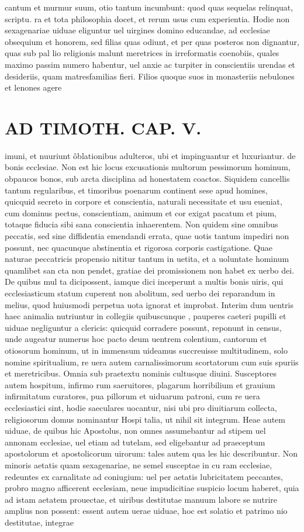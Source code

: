 \documentclass{article}
\begin{document}
\begin{pages}
cantum et murmur suum, otio tantum incumbunt: quod quas sequelas relinquat, scriptu. ra et tota philosophia docet, et rerum usus cum experientia. Hodie non sexagenariae uiduae eliguntur uel uirgines domino educandae, ad ecclesiae obsequium et honorem, sed filias quas odiunt, et per quas posteros non dignantur, quas sub pal lio religionis malunt meretrices in irreformatis coenobiis, quales maximo passim numero habentur, uel anxie ac turpiter in conscientiis urendas et desideriis, quam matresfamilias fieri. Filios quoque suos in monasteriis nebulones et lenones agere  \pend
\section*{AD TIMOTH. CAP. V. }
\marginpar{[ p.517 ]}\pstart imuni, et nuuriunt ôblationibus adulteros, ubi et impinguantur et luxuriantur. de bonis ecclesiae. Non est hic locus excusationis multorum pessimorum hominum, obpaucos bonos, sub arcta disciplina ad honestatem coactos. Siquidem cancellis tantum regularibus, et timoribus poenarum continent sese apud homines, quicquid secreto in corpore et conscientia, naturali necessitate et usu eueniat, cum dominus pectus, conscientiam, animum et cor exigat pacatum et pium, totaque fiducia sibi sana conscientia inhaerentem. Non quidem sine omnibus peccatis, sed sine diffidentia emendandi errata, quae uotis tantum impediri non possunt, nec quacunque abstinentia et rigorosa corporis castigatione. Quae naturae peccatricis propensio nititur tantum in uetita, et a uoluntate hominum quamlibet san cta non pendet, gratiae dei promissionem non habet ex uerbo dei. De quibus mul ta dicipossent, iamque dici inceperunt a multis bonis uiris, qui ecclesiasticum statum cuperent non abolitum, sed uerbo dei reparandum in melius, quod huiusmodi perpetua uota ignorat et improbat. Interim dum uentris haec animalia nutriuntur in collegiis quibuscunque , pauperes caeteri pupilli et uiduae negliguntur a clericis: quicquid corradere possunt, reponunt in census, unde augeatur numerus hoc pacto deum uentrem colentium, cantorum et otiosorum hominum, ut in immensum uideamus succreuisse multitudinem, solo nomine spiritualium, re uera autem carnalissimorum scortatorum cum suis spuriis et meretricibus. Omnia sub praetextu nominis cultusque diuini. Susceptores autem hospitum, infirmo rum saeruitores, plagarum horribilium et grauium infirmitatum curatores, pua pillorum et uiduarum patroni, cum re uera ecclesiastici sint, hodie saeculares uocantur, nisi ubi pro diuitiarum collecta, religiosorum domus nominantur Hospi talia, ut nihil sit integrum. Heae autem uiduae, de quibus hic Apostolus, non omnes assumebantur ad stipem uel annonam ecclesiae, uel etiam ad tutelam, sed eligebantur ad praeceptum apostolorum et apostolicorum uirorum: tales autem qua les hic describuntur. Non minoris aetatis quam sexagenariae, ne semel susceptae in cu ram ecclesiae, redeuntes ex carnalitate ad coniugium: uel per aetatis lubricitatem peccantes, probro magno afficerent ecclesiam, neue impudicitiae suspicio locum haberet, quia ad istam aetatem prouectae, et uiribus destitutae manuum labore se nutrire amplius non possent: essent autem uerae uiduae, hoc est solatio et patrimo nio destitutae, integrae 
\end{pages}
\end{document}
